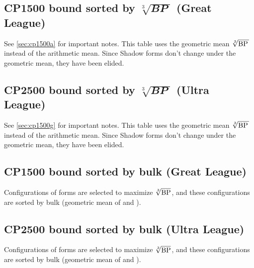 \subsection[CP1500 bound sorted by \protect{$\sqrt[3]{\BP\,}$} (Great League)]%
{CP1500 bound sorted by $\sqrt[3]{\mathbfit{BP}\;}$ (Great League)\label{sec:cp1500g}}
See \autoref{sec:cp1500a} for important notes.
This table uses the geometric mean $\sqrt[3]{\BP\,}$ instead of the arithmetic mean.
Since Shadow forms don't change under the geometric mean, they have been elided.

\subsection[CP2500 bound sorted by \protect{$\sqrt[3]{\BP\,}$} (Ultra League)]%
{CP2500 bound sorted by $\sqrt[3]{\mathbfit{BP}\;}$ (Ultra League)\label{sec:cp2500g}}
See \autoref{sec:cp1500g} for important notes.
This table uses the geometric mean $\sqrt[3]{\mbox{$\mathrm{BP}$}{}\,}$ instead of the arithmetic mean.
Since Shadow forms don't change under the geometric mean, they have been elided.

\subsection[CP1500 bounded sorted by bulk (Great League)]
{CP1500 bound sorted by bulk (Great League)\label{subsec:cp1500b}}
Configurations of forms are selected to maximize $\sqrt[3]{\mbox{$\mathrm{BP}$}}$, and these
 configurations are sorted by bulk (geometric mean of \MHP and ).

\subsection[CP2500 bounded sorted by bulk (Ultra League)]
{CP2500 bound sorted by bulk (Ultra League)\label{subsec:cp2500b}}
Configurations of forms are selected to maximize $\sqrt[3]{\mbox{$\mathrm{BP}$}}$, and these
 configurations are sorted by bulk (geometric mean of \MHP and ).


